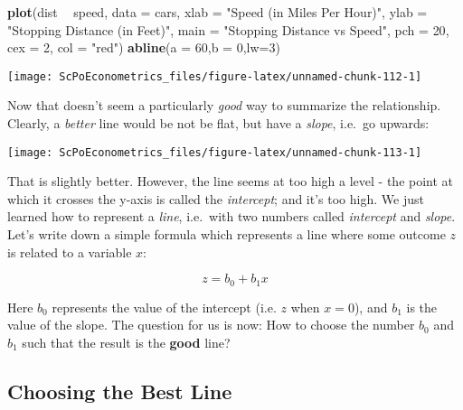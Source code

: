 \documentclass[]{book}
\newenvironment{Shaded}{\begin{snugshade}}{\end{snugshade}}
\newcommand{\DataTypeTok}[1]{\textcolor[rgb]{0.13,0.29,0.53}{#1}}
\newcommand{\DecValTok}[1]{\textcolor[rgb]{0.00,0.00,0.81}{#1}}
\newcommand{\KeywordTok}[1]{\textcolor[rgb]{0.13,0.29,0.53}{\textbf{#1}}}
\newcommand{\NormalTok}[1]{#1}
\newcommand{\OperatorTok}[1]{\textcolor[rgb]{0.81,0.36,0.00}{\textbf{#1}}}
\newcommand{\StringTok}[1]{\textcolor[rgb]{0.31,0.60,0.02}{#1}}
\begin{document}
\begin{Shaded}
\begin{Highlighting}[]
\KeywordTok{plot}\NormalTok{(dist }\OperatorTok{~}\StringTok{ }\NormalTok{speed, }\DataTypeTok{data =}\NormalTok{ cars,}
     \DataTypeTok{xlab =} \StringTok{"Speed (in Miles Per Hour)"}\NormalTok{,}
     \DataTypeTok{ylab =} \StringTok{"Stopping Distance (in Feet)"}\NormalTok{,}
     \DataTypeTok{main =} \StringTok{"Stopping Distance vs Speed"}\NormalTok{,}
     \DataTypeTok{pch  =} \DecValTok{20}\NormalTok{,}
     \DataTypeTok{cex  =} \DecValTok{2}\NormalTok{,}
     \DataTypeTok{col  =} \StringTok{"red"}\NormalTok{)}
\KeywordTok{abline}\NormalTok{(}\DataTypeTok{a =} \DecValTok{60}\NormalTok{,}\DataTypeTok{b =} \DecValTok{0}\NormalTok{,}\DataTypeTok{lw=}\DecValTok{3}\NormalTok{)}
\end{Highlighting}
\end{Shaded}

\begin{center}\texttt{[image: ScPoEconometrics\_files/figure-latex/unnamed-chunk-112-1]} \end{center}

Now that doesn't seem a particularly \emph{good} way to summarize the relationship. Clearly, a \emph{better} line would be not be flat, but have a \emph{slope}, i.e.~go upwards:

\begin{center}\texttt{[image: ScPoEconometrics\_files/figure-latex/unnamed-chunk-113-1]} \end{center}

That is slightly better. However, the line seems at too high a level - the point at which it crosses the y-axis is called the \emph{intercept}; and it's too high. We just learned how to represent a \emph{line}, i.e.~with two numbers called \emph{intercept} and \emph{slope}. Let's write down a simple formula which represents a line where some outcome \(z\) is related to a variable \(x\):

\begin{equation}
z = b_0 + b_1 x \label{eq:bline}
\end{equation}

Here \(b_0\) represents the value of the intercept (i.e. \(z\) when \(x=0\)), and \(b_1\) is the value of the slope. The question for us is now: How to choose the number \(b_0\) and \(b_1\) such that the result is the \textbf{good} line?

\hypertarget{choosing-the-best-line}{%
\subsection{Choosing the Best Line}\label{choosing-the-best-line}}
\end{document}

